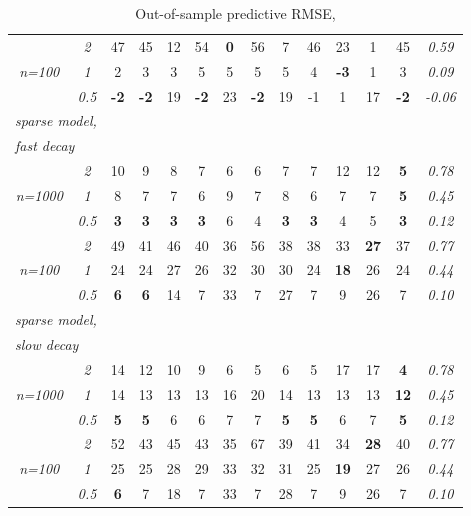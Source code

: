 \documentclass[12pt]{article}
\begin{document}
\begin{table}
\begin{center}
\begin{tabular}{cc|cc|cc|cc|cc|cc|c|c}
\cline{2-2}\rule{0pt}{3ex}& \it  2  & 47 & 45 & 12 & 54 & {\bf 0} & 56 & 7 & 46 & 23 & 1 & 45 & \it  0.59 \\
\it n=100  & \it  1  & 2 & 3 & 3 & 5 & 5 & 5 & 5 & 4 & {\bf -3} & 1 & 3 & \it  0.09 \\
& \it  0.5  & {\bf -2} & {\bf -2} & 19 & {\bf -2} & 23 & {\bf -2} & 19 & -1 & 1 & 17 & {\bf -2} & \it  -0.06 \\[1ex]
\hline\multicolumn{2}{l|}{\it sparse model,} &&&&&&&&&&&\\
\multicolumn{2}{l|}{\it fast decay} &&&&&&&&&&&\\& \it  2  & 10 & 9 & 8 & 7 & 6 & 6 & 7 & 7 & 12 & 12 & {\bf 5} & \it  0.78 \\
\it n=1000  & \it  1  & 8 & 7 & 7 & 6 & 9 & 7 & 8 & 6 & 7 & 7 & {\bf 5} & \it  0.45 \\
& \it  0.5  & {\bf 3} & {\bf 3} & {\bf 3} & {\bf 3} & 6 & 4 & {\bf 3} & {\bf 3} & 4 & 5 & {\bf 3} & \it  0.12 \\[1ex]
\cline{2-2}\rule{0pt}{3ex}& \it  2  & 49 & 41 & 46 & 40 & 36 & 56 & 38 & 38 & 33 & {\bf 27} & 37 & \it  0.77 \\
\it n=100  & \it  1  & 24 & 24 & 27 & 26 & 32 & 30 & 30 & 24 & {\bf 18} & 26 & 24 & \it  0.44 \\
& \it  0.5  & {\bf 6} & {\bf 6} & 14 & 7 & 33 & 7 & 27 & 7 & 9 & 26 & 7 & \it  0.10 \\[1ex]
\hline\multicolumn{2}{l|}{\it sparse model,} &&&&&&&&&&&\\
\multicolumn{2}{l|}{\it slow decay} &&&&&&&&&&&\\& \it  2  & 14 & 12 & 10 & 9 & 6 & 5 & 6 & 5 & 17 & 17 & {\bf 4} & \it  0.78 \\
\it n=1000  & \it  1  & 14 & 13 & 13 & 13 & 16 & 20 & 14 & 13 & 13 & 13 & {\bf 12} & \it  0.45 \\
& \it  0.5  & {\bf 5} & {\bf 5} & 6 & 6 & 7 & 7 & {\bf 5} & {\bf 5} & 6 & 7 & {\bf 5} & \it  0.12 \\[1ex]
\cline{2-2}\rule{0pt}{3ex}& \it  2  & 52 & 43 & 45 & 43 & 35 & 67 & 39 & 41 & 34 & {\bf 28} & 40 & \it  0.77 \\
\it n=100  & \it  1  & 25 & 25 & 28 & 29 & 33 & 32 & 31 & 25 & {\bf 19} & 27 & 26 & \it  0.44 \\
& \it  0.5  & {\bf 6} & 7 & 18 & 7 & 33 & 7 & 28 & 7 & 9 & 26 & 7 & \it  0.10 \\[1ex]
\hline\end{tabular}
\end{center}
\caption{\label{tab:sumtables} Out-of-sample predictive RMSE, 
}
\end{table}
\end{document}
